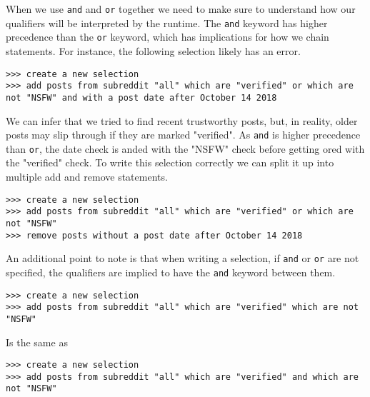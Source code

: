 When we use \texttt{and} and \texttt{or} together we need to make sure to understand how our qualifiers will be interpreted by the runtime. The \texttt{and} keyword has higher precedence than the \texttt{or} keyword, which has implications for how we chain statements. For instance, the following selection likely has an error.
\newline\begin{minipage}{\linewidth}\begin{lstlisting}
>>> create a new selection
>>> add posts from subreddit "all" which are "verified" or which are not "NSFW" and with a post date after October 14 2018
\end{lstlisting}\end{minipage}
We can infer that we tried to find recent trustworthy posts, but, in reality, older posts may slip through if they are marked "verified". As \texttt{and} is higher precedence than \texttt{or}, the date check is anded with the "NSFW" check before getting ored with the "verified" check. To write this selection correctly we can split it up into multiple add and remove statements.
\newline\begin{minipage}{\linewidth}\begin{lstlisting}
>>> create a new selection
>>> add posts from subreddit "all" which are "verified" or which are not "NSFW"
>>> remove posts without a post date after October 14 2018
\end{lstlisting}\end{minipage}
An additional point to note is that when writing a selection, if \texttt{and} or \texttt{or} are not specified, the qualifiers are implied to have the \texttt{and} keyword between them.
\newline\begin{minipage}{\linewidth}\begin{lstlisting}
>>> create a new selection
>>> add posts from subreddit "all" which are "verified" which are not "NSFW"
\end{lstlisting}\end{minipage}
Is the same as
\newline\begin{minipage}{\linewidth}\begin{lstlisting}
>>> create a new selection
>>> add posts from subreddit "all" which are "verified" and which are not "NSFW"
\end{lstlisting}\end{minipage}

